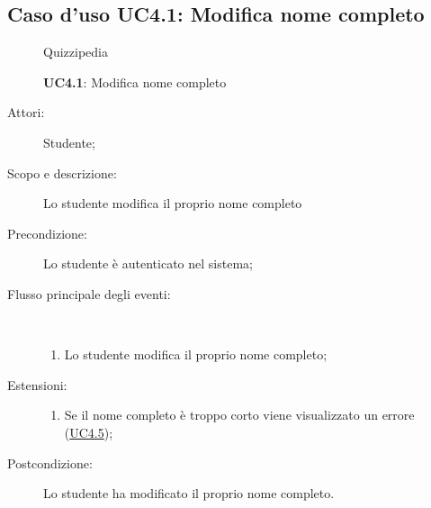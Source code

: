 \subsection{Caso d'uso UC4.1: Modifica nome completo}
\begin{figure}[H]
	\centering
	\begin{resizedtikzpicture}{\textwidth}
		\begin{umlsystem}[x=0, fill=lightgray!20]{Quizzipedia}
		\end{umlsystem}
	\end{resizedtikzpicture}
	\caption{\textbf{UC4.1}: Modifica nome completo}
	\label{UC4.1}
\end{figure}
\begin{description}
	\item[Attori:] Studente;
	\item[Scopo e descrizione:] Lo studente modifica il proprio nome completo
	\item[Precondizione:] Lo studente è autenticato nel sistema;
	
	\item[Flusso principale degli eventi:] \ 
	\begin{enumerate}
		\item Lo studente modifica il proprio nome completo;
		
	\end{enumerate}
	\item[Estensioni:]
	\begin{enumerate}
		\item Se il nome completo è troppo corto viene visualizzato un errore (\hyperlink{UC4.5}{UC4.5});
		
	\end{enumerate}
	\item[Postcondizione:] Lo studente ha modificato il proprio nome completo.
\end{description}
\hypertarget{UC4.2}{}
